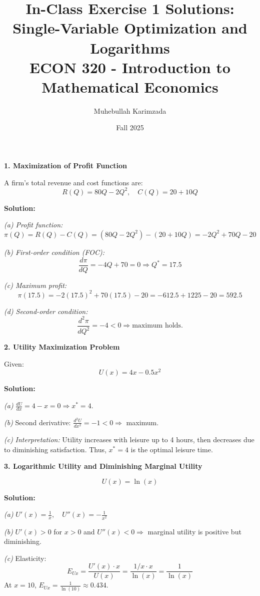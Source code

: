 \documentclass[12pt]{article}
\title{In-Class Exercise 1 Solutions: Single-Variable Optimization and Logarithms\\[7pt]
\large ECON 320 - Introduction to Mathematical Economics}
\author{Muhebullah Karimzada}
\date{Fall 2025}
\begin{document}
\maketitle

\vspace{1em}

\textbf{1. Maximization of Profit Function}

A firm's total revenue and cost functions are:
\[
R(Q) = 80Q - 2Q^2, \quad C(Q) = 20 + 10Q
\]

\textbf{Solution:}

\textit{(a) Profit function:}
\[
\pi(Q) = R(Q) - C(Q) = (80Q - 2Q^2) - (20 + 10Q) = -2Q^2 + 70Q - 20
\]

\textit{(b) First-order condition (FOC):}
\[
\frac{d\pi}{dQ} = -4Q + 70 = 0 \Rightarrow Q^* = 17.5
\]

\textit{(c) Maximum profit:}
\[
\pi(17.5) = -2(17.5)^2 + 70(17.5) - 20 = -612.5 + 1225 - 20 = 592.5
\]

\textit{(d) Second-order condition:}
\[
\frac{d^2\pi}{dQ^2} = -4 < 0 \Rightarrow \text{maximum holds.}
\]
\newpage
\vspace{1em}

\textbf{2. Utility Maximization Problem}

Given:
\[
U(x) = 4x - 0.5x^2
\]

\textbf{Solution:}

\textit{(a)} \( \frac{dU}{dx} = 4 - x = 0 \Rightarrow x^* = 4. \)

\textit{(b)} Second derivative: \( \frac{d^2U}{dx^2} = -1 < 0 \Rightarrow \) maximum.

\textit{(c)} \textit{Interpretation:} Utility increases with leisure up to 4 hours, then decreases due to diminishing satisfaction. Thus, \(x^* = 4\) is the optimal leisure time.

\vspace{1em}

\textbf{3. Logarithmic Utility and Diminishing Marginal Utility}

\[
U(x) = \ln(x)
\]

\textbf{Solution:}

\textit{(a)} \( U'(x) = \frac{1}{x}, \quad U''(x) = -\frac{1}{x^2} \)

\textit{(b)} \( U'(x) > 0 \) for \( x>0 \) and \( U''(x) < 0 \Rightarrow \) marginal utility is positive but diminishing.

\textit{(c)} Elasticity:
\[
E_{Ux} = \frac{U'(x) \cdot x}{U(x)} = \frac{1/x \cdot x}{\ln(x)} = \frac{1}{\ln(x)}
\]
At \( x=10 \), \( E_{Ux} = \frac{1}{\ln(10)} \approx 0.434. \)
\end{document}

